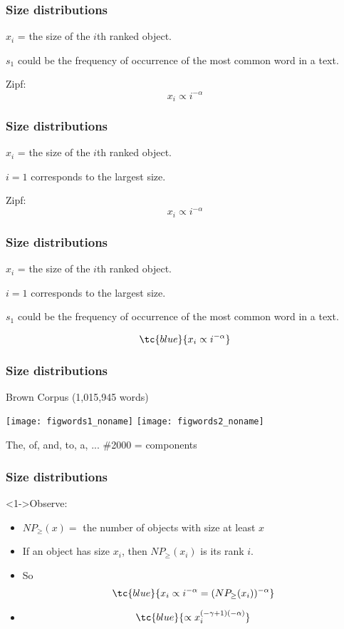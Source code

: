 \begin{frame}
  \frametitle{Size distributions}

$x_i$ = the size of the $i$th ranked object.


\inv

$s_1$ could be the frequency of occurrence of
the most common word in a text.

Zipf:
$$ x_i \propto i^{-\alpha} $$

\end{frame}

\begin{frame}
  \frametitle{Size distributions}

$x_i$ = the size of the $i$th ranked object.

$i=1$ corresponds to the largest size.


\inv
Zipf:
$$ x_i \propto i^{-\alpha} $$


\end{frame}

\begin{frame}
  \frametitle{Size distributions}

$x_i$ = the size of the $i$th ranked object.

$i=1$ corresponds to the largest size.

$s_1$ could be the frequency of occurrence of
the most common word in a text.

$$ \tc{blue}{x_i \propto i^{-\alpha}} $$

\end{frame}

\begin{frame}
  \frametitle{Size distributions}

Brown Corpus (1,015,945 words)

\texttt{[image: figwords1\_noname]}
\texttt{[image: figwords2\_noname]}

The, of, and, to, a, ...  \#2000 = components

\end{frame}

\begin{frame}
  \frametitle{Size distributions}

  \begin{block}<1->{Observe:}
    \begin{itemize}
    \item<1-> $ NP_\ge(x) = $ the number of objects with size at least $x$
    \item<2-> If an object has size $x_i$, then $NP_\ge(x_i)$ is its rank $i$.
    \item<3-> So 
      $$\tc{blue}{x_i \propto i^{-\alpha} = (NP_\ge(x_i))^{-\alpha}}$$
    \item<4-> 
      $$\tc{blue}{ \propto x_i^{(-\gamma+1)(-\alpha)}}$$
    \end{itemize}
  \end{block}

\end{frame}

